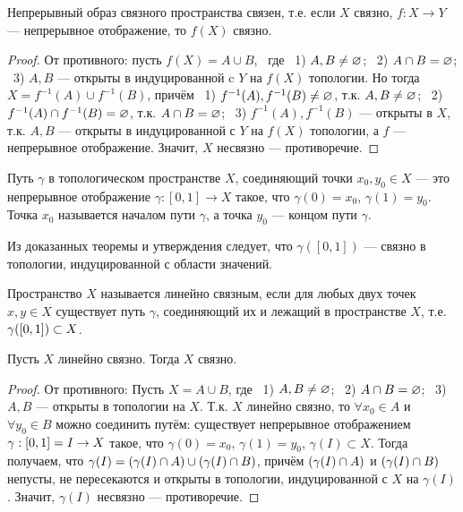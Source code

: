 \begin{statement}
    Непрерывный образ связного пространства связен, т.е. если $X$ связно, $f: X \rightarrow Y$ --- непрерывное отображение, то $f(X)$ связно.
\end{statement}
\begin{proof}
    От противного: пусть $f(X) = A \cup B$, \, где \, 1) $A, B \neq \varnothing$; \ 2) $A \cap B = \varnothing$; \ 3) $A, B$ --- открыты в индуцированной c $Y$ на $f(X)$ топологии. Но тогда $X = f^{-1}(A) \cup f^{-1}(B)$, причём \,
    1) $f^{-1}(A), f^{-1}(B) \neq \varnothing$, т.к. $A, B \neq \varnothing$; \ 2) $f^{-1}(A) \cap f^{-1}(B) = \varnothing$, т.к. $A \cap B = \varnothing$; \ 3) $f^{-1}(A), f^{-1}(B)$ --- открыты в $X$, т.к. $A, B$ --- открыты в индуцированной с $Y$ на $f(X)$ топологии, а $f$ --- непрерывное отображение.
    Значит, $X$ несвязно --- противоречие.
\end{proof}

\begin{definition}
    Путь $\gamma$ в топологическом пространстве $X$, соединяющий точки $x_0, y_0 \in X$ --- это непрерывное отображение $\gamma: [0,1] \rightarrow X$ такое, что $\gamma(0) = x_0$, $\gamma(1) = y_0$.
    Точка $x_0$ называется началом пути $\gamma$, а точка $y_0$ --- концом пути $\gamma$.
\end{definition}

\begin{nota_bene}
    Из доказанных теоремы и утверждения следует, что $\gamma([0, 1])$ --- связно в топологии, индуцированной с области значений.
\end{nota_bene}

\begin{definition}
    Пространство $X$ называется линейно связным, если для любых двух точек $x, y \in X$ существует путь $\gamma$, соединяющий их и лежащий в пространстве $X$, т.е. $\gamma(\left[0, 1\right]) \subset X$.
\end{definition}

\begin{theorem}
    Пусть $X$ линейно связно. Тогда $X$ связно.
\end{theorem}
\begin{proof}
    От противного: Пусть $X = A \cup B$, где \, 1) $A, B \neq \varnothing$; \ 2) $A \cap B = \varnothing$; \ 3) $A, B$ --- открыты в топологии на $X$. Т.к. $X$ линейно связно, то $\forall x_0 \in A$ и $\forall y_0 \in B$ можно соединить путём: 
    существует непрерывное отображением $\gamma: \left[0, 1\right] = I \rightarrow X$ такое, что $\gamma(0) = x_0$, $\gamma(1) = y_0$, $\gamma(I) \subset X$.
    Тогда получаем, что $\gamma(I) = \left(\gamma(I) \cap A\right) \cup \left(\gamma(I) \cap B\right)$, причём $\left(\gamma(I) \cap A\right)$ и $\left(\gamma(I) \cap B\right)$ непусты, не пересекаются и открыты в топологии, индуцированной с $X$ на $\gamma(I)$. Значит, $\gamma(I)$ несвязно --- противоречие.
\end{proof}

